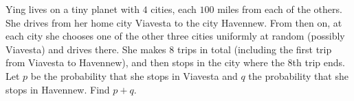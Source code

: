 Ying lives on a tiny planet with $4$ cities, each $100$ miles from each of the others. She drives from her home city Viavesta to the city Havennew. From then on, at each city she chooses one of the other three cities uniformly at random (possibly Viavesta) and drives there. She makes $8$ trips in total (including the first trip from Viavesta to Havennew), and then stops in the city where the $8$th trip ends. Let $p$ be the probability that she stops in Viavesta and $q$ the probability that she stops in Havennew. Find $p+q$.
